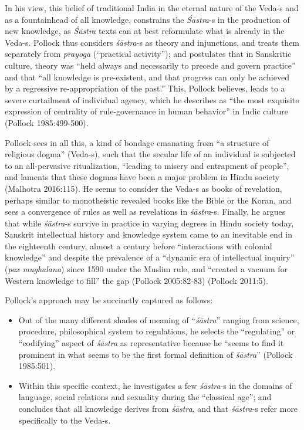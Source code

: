 In his view, this belief of traditional India in the eternal nature of the Veda-s and as a fountainhead of all knowledge, constrains the {\sl Śāstra}-s in the production of new knowledge, as {\sl Śāstra} texts can at best reformulate what is already in the Veda-s. Pollock thus considers {\sl śāstra}-s as theory and injunctions, and treats them separately from {\sl prayoga} (``practical activity''); and postulates that in Sanskritic culture, theory was ``held always and necessarily to precede and govern practice'' and that ``all knowledge is pre-existent, and that progress can only be achieved by a regressive re-appropriation of the past.'' This, Pollock believes, leads to a severe curtailment of individual agency, which he describes as ``the most exquisite expression of centrality of rule-governance in human behavior'' in Indic culture (Pollock 1985:499-500). 

\newpage

Pollock sees in all this, a kind of bondage emanating from ``a structure of religious dogma'' (Veda-s), such that the secular life of an individual is subjected to an all-pervasive ritualization, ``leading to misery and entrapment of people'', and laments that these dogmas have been a major problem in Hindu society (Malhotra 2016:115). He seems to consider the Veda-s as books of revelation, perhaps similar to monotheistic revealed books like the Bible or the Koran, and sees a convergence of rules as well as revelations in {\sl śāstra}-s. Finally, he argues that while {\sl śāstra}-s survive in practice in varying degrees in Hindu society today, Sanskrit intellectual history and knowledge system came to an inevitable end in the eighteenth century, almost a century before ``interactions with colonial knowledge'' and despite the prevalence of a ``dynamic era of intellectual inquiry'' ({\sl pax mughalana}) since 1590 under the Muslim rule, and ``created a vacuum for Western knowledge to fill'' the gap (Pollock 2005:82-83) (Pollock 2011:5).

Pollock's approach may be succinctly captured as follows:
\begin{itemize}
\item Out of the many different shades of meaning of ``{\sl śāstra}'' ranging from science, procedure, philosophical system to regulations, he selects the ``regulating'' or ``codifying'' aspect of {\sl śāstra} as representative because he ``seems to find it prominent in what seems to be the first formal definition of {\sl śāstra}'' (Pollock 1985:501).

\item Within this specific context, he investigates a few {\sl śāstra}-s in the domains of language, social relations and sexuality during the ``classical age''; and concludes that all knowledge derives from {\sl śāstra}, and that {\sl śāstra}-s refer more specifically to the Veda-s. 
\end{itemize}

